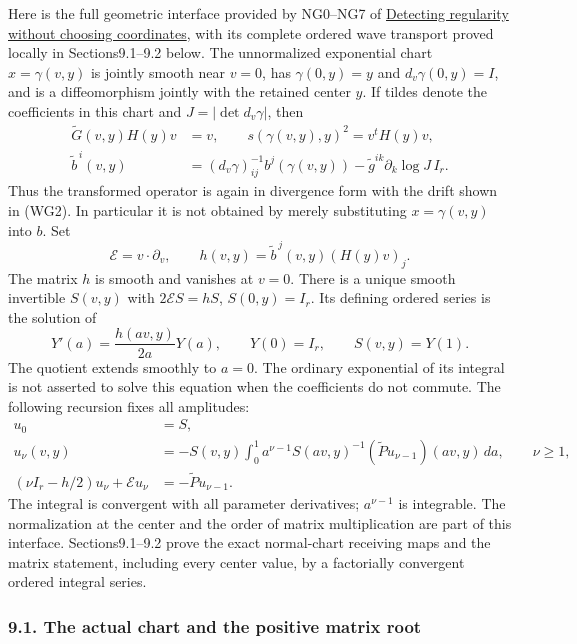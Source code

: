 \documentclass[
  11pt,
]{article}
\begin{document}
Here is the full geometric interface provided by NG0--NG7 of
\href{geometric-microlocal-calculus.pdf}{Detecting regularity without
choosing coordinates}, with its complete ordered wave transport proved
locally in Sections9.1--9.2 below. The unnormalized exponential chart
\(x=\gamma(v,y)\) is jointly smooth near \(v=0\), has \(\gamma(0,y)=y\)
and \(d_v\gamma(0,y)=I\), and is a diffeomorphism jointly with the
retained center \(y\). If tildes denote the coefficients in this chart
and \(J=|\det d_v\gamma|\), then \[
\begin{split}
 \widetilde G(v,y)H(y)v&=v,\qquad
 s(\gamma(v,y),y)^2=v^tH(y)v,\\
 \widetilde b^{\,i}(v,y)&=(d_v\gamma)^{-1}_{ij}b^j(\gamma(v,y))
       -\widetilde g^{ik}\partial_k\log J\,I_r.
\end{split}
 \tag{WG2}
\] Thus the transformed operator is again in divergence form with the
drift shown in (WG2). In particular it is not obtained by merely
substituting \(x=\gamma(v,y)\) into \(b\). Set \[
 \mathcal E=v\cdot\partial_v,\qquad
 h(v,y)=\widetilde b^{\,j}(v,y)(H(y)v)_j.
 \tag{WG3}
\] The matrix \(h\) is smooth and vanishes at \(v=0\). There is a unique
smooth invertible \(S(v,y)\) with \(2\mathcal ES=hS\), \(S(0,y)=I_r\).
Its defining ordered series is the solution of \[
 Y'(a)=\frac{h(av,y)}{2a}Y(a),\qquad Y(0)=I_r,
 \qquad S(v,y)=Y(1).
 \tag{WG4}
\] The quotient extends smoothly to \(a=0\). The ordinary exponential of
its integral is not asserted to solve this equation when the
coefficients do not commute. The following recursion fixes all
amplitudes: \[
\begin{split}
 u_0&=S,\\
 u_\nu(v,y)&=-S(v,y)\int_0^1
        a^{\nu-1}S(av,y)^{-1}(\widetilde P u_{\nu-1})(av,y)\,da,
        \qquad \nu\geq1,\\
 (\nu I_r-h/2)u_\nu+\mathcal Eu_\nu&=-\widetilde Pu_{\nu-1}.
\end{split}
 \tag{WG5}
\] The integral is convergent with all parameter derivatives;
\(a^{\nu-1}\) is integrable. The normalization at the center and the
order of matrix multiplication are part of this interface.
Sections9.1--9.2 prove the exact normal-chart receiving maps and the
matrix statement, including every center value, by a factorially
convergent ordered integral series.

\subsubsection{9.1. The actual chart and the positive matrix
root}\label{the-actual-chart-and-the-positive-matrix-root}
\end{document}
